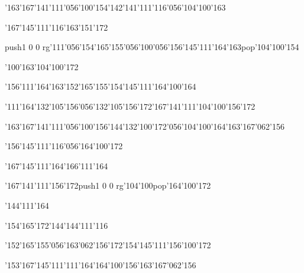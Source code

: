 \null\vfill\ipa\centerline{\enskip\enskip\enskip\enskip\char'163\char'167\char'141\char'111\char'056\char'100\char'154\enskip\char'142\char'141\char'111\char'116\char'056\char'104\char'100\char'163}\medskip\centerline{\enskip\enskip\enskip\enskip\char'167\char'145\char'111\char'116\enskip\char'163\char'151\char'172\enskip\enskip\enskip\enskip}\medskip\centerline{\enskip\pdfcolorstack\match push{1 0 0 rg}\char'111\char'056\char'154\char'165\char'155\char'056\char'100\char'056\char'156\char'145\char'111\char'164\char'163\pdfcolorstack\match pop{}\enskip\enskip\enskip\enskip\char'104\char'100\char'154}\medskip\centerline{\enskip\char'100\char'163\enskip\enskip\enskip\enskip\enskip\enskip\enskip\enskip\char'104\char'100\char'172}\medskip\centerline{\enskip\enskip\enskip\enskip\enskip\char'156\char'111\char'164\char'163\enskip\enskip\char'152\char'165\char'155\enskip\char'154\char'145\char'111\enskip\enskip\enskip\char'164\char'100\char'164}\medskip\centerline{\enskip\char'111\char'164\enskip\char'132\char'105\char'156\char'056\char'132\char'105\char'156\char'172\enskip\char'167\char'141\char'111\enskip\enskip\enskip\enskip\char'104\char'100\char'156\char'172}\medskip\centerline{\enskip\char'163\char'167\char'141\char'111\char'056\char'100\char'156\enskip\enskip\enskip\enskip\enskip\enskip\char'144\char'132\char'100\char'172\char'056\char'104\char'100\char'164\enskip\char'163\char'167\char'062\char'156}\medskip\vfill\footline{\hfil\tt\folio\hfil}\eject
\null\vfill\ipa\centerline{\enskip\enskip\enskip\enskip\enskip\enskip\enskip\enskip\enskip\enskip\enskip\char'156\char'145\char'111\char'116\char'056\char'164\char'100\char'172}\medskip\centerline{\enskip\enskip\enskip\enskip\char'167\char'145\char'111\char'164\enskip\enskip\enskip\enskip\char'166\char'111\char'164}\medskip\centerline{\enskip\enskip\enskip\enskip\enskip\enskip\char'167\char'141\char'111\char'156\char'172\enskip\pdfcolorstack\match push{1 0 0 rg}\char'104\char'100\pdfcolorstack\match pop{}\enskip\char'164\char'100\char'172}\medskip\centerline{\enskip\enskip\enskip\enskip\enskip\enskip\enskip\enskip\enskip\enskip\enskip\char'144\char'111\char'164}\medskip\centerline{\enskip\enskip\enskip\enskip\enskip\char'154\char'165\char'172\char'144\enskip\enskip\char'144\char'111\char'116\enskip\enskip\enskip\enskip\enskip\enskip\enskip\enskip\enskip\enskip}\medskip\centerline{\enskip\enskip\enskip\enskip\char'152\char'165\char'155\char'056\char'163\char'062\char'156\char'172\enskip\char'154\char'145\char'111\enskip\char'156\char'100\char'172\enskip\enskip\enskip\enskip\enskip}\medskip\centerline{\enskip\char'153\char'167\char'145\char'111\enskip\enskip\enskip\enskip\char'111\char'164\enskip\enskip\enskip\enskip\enskip\enskip\enskip\char'164\char'100\char'156\enskip\char'163\char'167\char'062\char'156}\medskip\vfill\footline{\hfil\tt\folio\hfil}\eject
